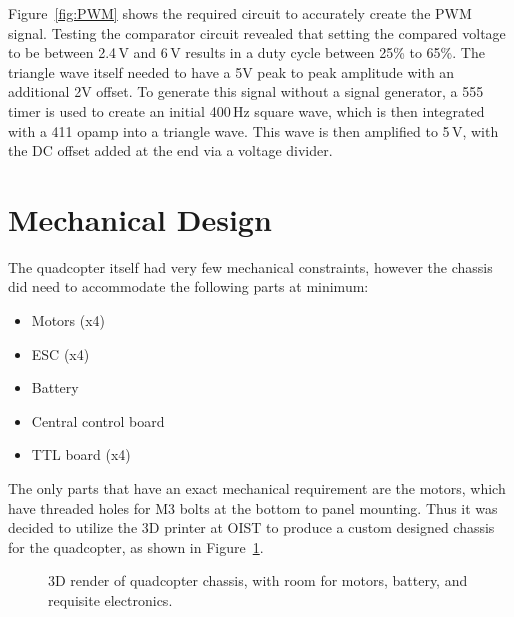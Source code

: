 \documentclass[11pt]{article} %
\begin{document}
Figure~\ref{fig:PWM} shows the required circuit to accurately create the PWM signal. Testing the comparator circuit revealed that setting the compared voltage to be between 2.4\,V and 6\,V results in a duty cycle between 25\% to 65\%. The triangle wave itself needed to have a 5V peak to peak amplitude with an additional 2V offset. To generate this signal without a signal generator, a 555 timer is used to create an initial 400\,Hz square wave, which is then integrated with a 411 opamp into a triangle wave. This wave is then amplified to 5\,V, with the DC offset added at the end via a voltage divider.


\section{Mechanical Design}
The quadcopter itself had very few mechanical constraints, however the chassis did need to accommodate the following parts at minimum:
\begin{itemize}
\item Motors (x4)
\item ESC (x4)
\item Battery
\item Central control board
\item TTL board (x4)
\end{itemize}
The only parts that have an exact mechanical requirement are the motors, which have threaded holes for M3 bolts at the bottom to panel mounting. Thus it was decided to utilize the 3D printer at OIST to produce a custom designed chassis for the quadcopter, as shown in Figure~\ref{fig:chassis}.
\begin{figure}[h]
	\caption{3D render of quadcopter chassis, with room for motors, battery, and requisite electronics.}
	\label{fig:chassis}
\end{figure}
\end{document}
